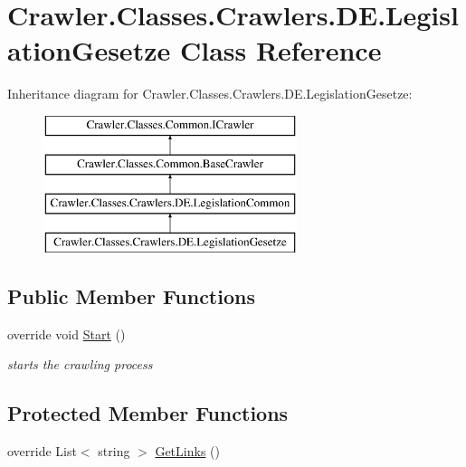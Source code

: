 \hypertarget{class_crawler_1_1_classes_1_1_crawlers_1_1_d_e_1_1_legislation_gesetze}{\section{Crawler.\-Classes.\-Crawlers.\-D\-E.\-Legislation\-Gesetze Class Reference}
\label{class_crawler_1_1_classes_1_1_crawlers_1_1_d_e_1_1_legislation_gesetze}
}
Inheritance diagram for Crawler.\-Classes.\-Crawlers.\-D\-E.\-Legislation\-Gesetze\-:\begin{figure}[H]
\begin{center}
\leavevmode
\includegraphics[height=4.000000cm]{class_crawler_1_1_classes_1_1_crawlers_1_1_d_e_1_1_legislation_gesetze}
\end{center}
\end{figure}
\subsection*{Public Member Functions}
\begin{DoxyCompactItemize}
\item 
override void \hyperlink{class_crawler_1_1_classes_1_1_crawlers_1_1_d_e_1_1_legislation_gesetze_ac4bfb29a94183afb5041949aad71d69e}{Start} ()
\begin{DoxyCompactList}\small\item\em starts the crawling process \end{DoxyCompactList}\end{DoxyCompactItemize}
\subsection*{Protected Member Functions}
\begin{DoxyCompactItemize}
\item 
override List$<$ string $>$ \hyperlink{class_crawler_1_1_classes_1_1_crawlers_1_1_d_e_1_1_legislation_gesetze_ae4bff1f98a70c82cf83228beafa5e4df}{Get\-Links} ()
\end{DoxyCompactItemize}
